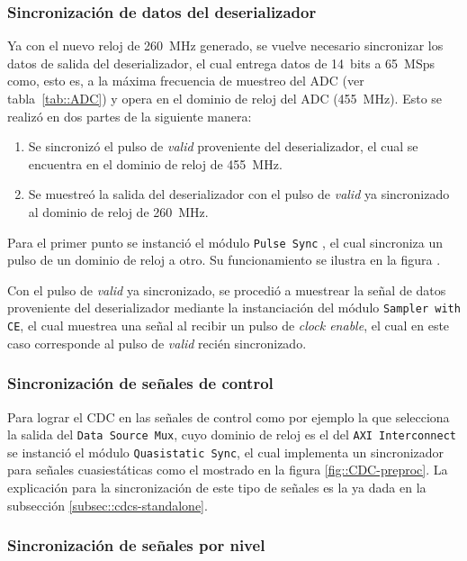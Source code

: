 \documentclass[../../main.tex]{subfiles}
\begin{document}
\subsubsection{Sincronización de datos del deserializador}
Ya con el nuevo reloj de 260~MHz generado, se vuelve necesario sincronizar los datos de salida del deserializador, el cual entrega datos de 14~bits a 65~MSps como, esto es, a la máxima frecuencia de muestreo del ADC (ver tabla~\ref{tab::ADC}) y opera en el dominio de reloj del ADC (455~MHz). Esto se realizó en dos partes de la siguiente manera:
\begin{enumerate}
    \item Se sincronizó el pulso de \textit{valid} proveniente del deserializador, el cual se encuentra en el dominio de reloj de 455~MHz. 
    \item Se muestreó la salida del deserializador con el pulso de \textit{valid} ya sincronizado al dominio de reloj de 260~MHz.
\end{enumerate}

Para el primer punto se instanció el módulo \texttt{Pulse Sync} , el cual sincroniza un pulso de un dominio de reloj a otro. Su funcionamiento se ilustra en la figura .

Con el pulso de \textit{valid} ya sincronizado, se procedió a muestrear la señal de datos proveniente del deserializador mediante la instanciación del módulo \texttt{Sampler with CE}, el cual muestrea una señal al recibir un pulso de \textit{clock enable}, el cual en este caso corresponde al pulso de \textit{valid} recién sincronizado.


\subsubsection{Sincronización de señales de control}
Para lograr el CDC en las señales de control como por ejemplo la que selecciona la salida del \texttt{Data Source Mux}, cuyo dominio de reloj es el del \texttt{AXI Interconnect} se instanció el módulo \texttt{Quasistatic Sync}, el cual implementa un sincronizador para señales cuasiestáticas como el mostrado en la figura \ref{fig::CDC-preproc}. La explicación para la sincronización de este tipo de señales es la ya dada en la subsección \ref{subsec::cdcs-standalone}.

\subsubsection{Sincronización de señales por nivel}
\end{document}
